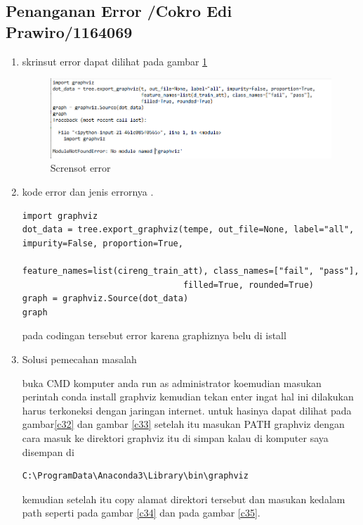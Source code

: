 \subsection{Penanganan Error /Cokro Edi Prawiro/1164069}
\begin{enumerate}
\item skrinsut error dapat dilihat pada gambar \ref{c31}

\begin{figure}[ht]
      \centerline{\includegraphics[width=1\textwidth]
      {figures/cokro/c31}}
      \caption{Scrensot error }
      \label{c31}
     \end{figure}

\item kode error dan jenis errornya .
\begin{verbatim}
import graphviz
dot_data = tree.export_graphviz(tempe, out_file=None, label="all", impurity=False, proportion=True,
                                feature_names=list(cireng_train_att), class_names=["fail", "pass"], 
                                filled=True, rounded=True)
graph = graphviz.Source(dot_data)
graph
\end{verbatim}

pada codingan tersebut error karena graphiznya belu di istall 

\item Solusi pemecahan masalah \par
buka CMD komputer anda run as administrator koemudian masukan perintah conda install graphviz kemudian tekan enter ingat hal ini dilakukan harus terkoneksi dengan jaringan internet. untuk hasinya dapat dilihat pada gambar\ref{c32} dan gambar \ref{c33}
setelah itu masukan PATH graphviz dengan cara masuk ke direktori graphviz itu di simpan kalau di komputer saya disempan di 
\begin{verbatim}C:\ProgramData\Anaconda3\Library\bin\graphviz \end{verbatim} kemudian setelah itu copy alamat direktori tersebut dan masukan kedalam path seperti pada gambar \ref{c34} dan pada gambar \ref{c35}.


\end{enumerate}

